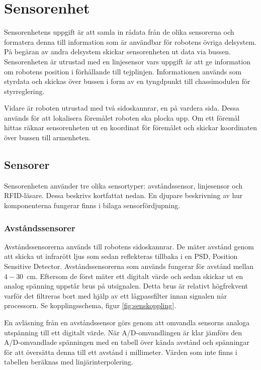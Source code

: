 \section{Sensorenhet}
Sensorenhetens uppgift är att samla in rådata från de olika sensorerna och formatera denna till information som är användbar för robotens övriga delsystem. På begäran av andra delsystem skickar sensorenheten ut data via bussen. Sensorenheten är utrustad
med en linjesensor vars uppgift är att ge information om robotens position i förhållande till tejplinjen. Informationen används som styrdata och skickas över bussen i form av en tyngdpunkt till chassimodulen för styrreglering.

Vidare är roboten utrustad med två sidoskannrar, en på vardera sida. Dessa används för att lokalisera föremålet roboten ska plocka upp. Om ett föremål hittas räknar sensorenheten ut en koordinat för föremålet och skickar koordinaten över bussen till armenheten.


\subsection{Sensorer}
Sensorenheten använder tre olika sensortyper: avståndssensor, linjesensor och RFID-läsare.
Dessa beskrivs kortfattat nedan. En djupare beskrivning av hur komponenterna fungerar finns i bilaga sensorfördjupning.

\subsubsection{Avståndssensorer}
Avståndssensorerna används till robotens sidoskannrar. De mäter avstånd genom att skicka ut infrarött ljus som sedan reflekteras tillbaka i en PSD, Position Sensitive Detector. Avståndssensorerna som används fungerar för avstånd mellan \mbox{$4-30$ cm}. Eftersom de först mäter ett digitalt värde och sedan skickar ut en analog spänning uppstår brus på utsignalen. Detta brus är relativt högfrekvent varför det filtreras bort med hjälp av ett lågpassfilter innan signalen når processorn. Se kopplingsschema, figur \ref{fig:senskoppling}.

En avläsning från en avståndssensor görs genom att omvandla sensorns analoga utspänning till ett digitalt värde. När A/D-omvandlingen är klar jämförs den A/D-omvandlade spänningen med en tabell över kända avstånd och spänningar för att översätta denna till ett avstånd i millimeter. Värden som inte finns i tabellen beräknas med linjärinterpolering. 


